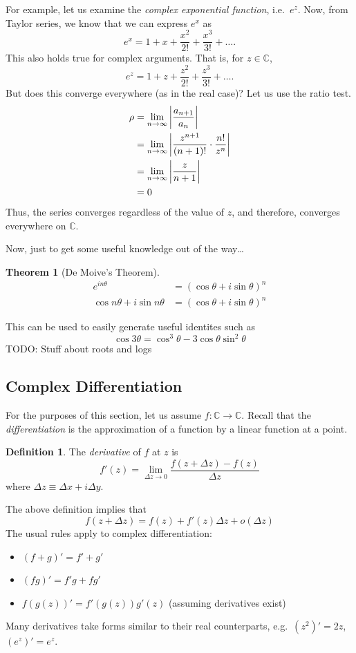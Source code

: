 \documentclass[10pt]{scrartcl}
\numberwithin{equation}{subsection}
\theoremstyle{definition}
\newtheorem{definition}{Definition}[section]
\newtheorem{theorem}{Theorem}[section]
\theoremstyle{remark}
\newenvironment{definitionSR}
{
\begin{siderules}
\begin{definition}
}
{
\end{definition}
\end{siderules}
}
\newenvironment{theoremSR}
{
\begin{siderules}
\begin{theorem}
}
{
\end{theorem}
\end{siderules}
}
\newcommand{\Complex}{\mathbb{C}}
\begin{document}
For example, let us examine the \textit{complex exponential function}, i.e.\
$e^z$. Now, from Taylor series, we know that we can express $e^x$ as
\[
e^x = 1 + x + \frac{x^2}{2!} + \frac{x^3}{3!} + \ldots.
\]
This also holds true for complex arguments. That is, for $z \in \Complex$,
\begin{equation}
e^z = 1 + z + \frac{z^2}{2!} + \frac{z^3}{3!} + \ldots.
\end{equation}
But does this converge everywhere (as in the real case)? Let us use the ratio
test.
\begin{align*}
\rho &= \lim_{n \to \infty} \abs{\frac{a_{n+1}}{a_n}} \\
 &= \lim_{n \to \infty} \abs{\frac{z^{n+1}}{(n+1)!} \cdot \frac{n!}{z^n}} \\
 &= \lim_{n \to \infty} \abs{\frac{z}{n+1}} \\
 &= 0
\end{align*}
Thus, the series converges regardless of the value of $z$, 
and therefore, converges everywhere on $\Complex$.

Now, just to get some useful knowledge out of the way\ldots
\begin{theoremSR}[De Moive's Theorem]
\begin{align*}
e^{in\theta} &= (\cos{\theta} + i \sin{\theta})^n \\
\cos{n\theta} + i \sin{n\theta} &= (\cos{\theta} + i \sin{\theta})^n
\end{align*}
\end{theoremSR}
This can be used to easily generate useful identites such as 
\[
\cos{3\theta} = \cos^3{\theta} - 3\cos{\theta}\sin^2{\theta}
\]
TODO: Stuff about roots and logs
\subsection{Complex Differentiation}
For the purposes of this section, let us assume $f : \Complex \to \Complex$.
Recall that the \textit{differentiation} is the approximation of a function by a
linear function at a point.
\begin{definitionSR}
	The \textit{derivative} of $f$ at $z$ is
	\begin{equation*}
		f'(z) = \lim_{\Delta z \to 0} \frac{f(z + \Delta z) -
		f(z)}{\Delta z}
	\end{equation*}
	where $\Delta z \equiv \Delta x + i \Delta y$.
\end{definitionSR}
The above definition implies that
\begin{equation}
	f(z + \Delta z) = f(z) + f'(z) \Delta z + o(\Delta z)
\end{equation}
The usual rules apply to complex differentiation:
\begin{itemize}
	\item $(f + g)' = f' + g'$
	\item $(fg)' = f'g + fg'$ 
	\item $f(g(z))' = f'(g(z))g'(z)$ (assuming derivatives exist)
\end{itemize}
Many derivatives take forms similar to their real counterparts, e.g.\ $(z^2)' =
2z$, $(e^z)' = e^z$. 
\end{document}
